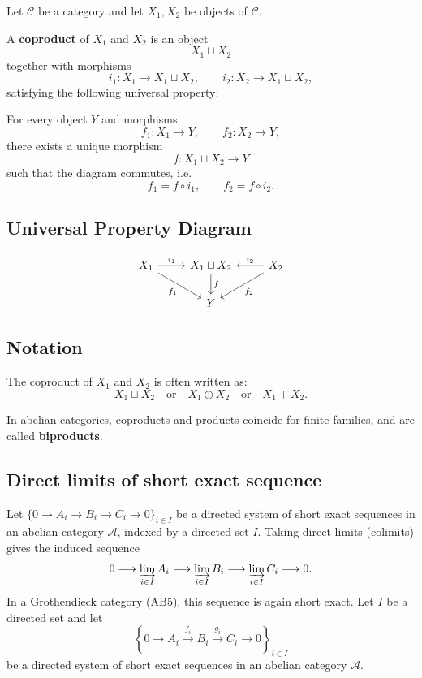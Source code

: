Let $\mathcal{C}$ be a category and let $X_1, X_2$ be objects of $\mathcal{C}$.

A \textbf{coproduct} of $X_1$ and $X_2$ is an object
\[
X_1 \sqcup X_2
\]
together with morphisms
\[
i_1: X_1 \to X_1 \sqcup X_2,
\qquad
i_2: X_2 \to X_1 \sqcup X_2,
\]
satisfying the following universal property:

For every object $Y$ and morphisms
\[
f_1: X_1 \to Y,
\qquad
f_2: X_2 \to Y,
\]
there exists a unique morphism
\[
f: X_1 \sqcup X_2 \to Y
\]
such that the diagram commutes, i.e.
\[
f_1 = f \circ i_1,
\qquad
f_2 = f \circ i_2.
\]

\subsection{Universal Property Diagram}

\[
\begin{tikzcd}
X_1 \arrow[r, "i_1"] \arrow[dr, "f_1"'] & X_1 \sqcup X_2 \arrow[d, "f"] & X_2 \arrow[l, "i_2"'] \arrow[dl, "f_2"] \\
& Y &
\end{tikzcd}
\]

\subsection{Notation}

The coproduct of $X_1$ and $X_2$ is often written as:
\[
X_1 \sqcup X_2
\quad \text{or} \quad
X_1 \oplus X_2
\quad \text{or} \quad
X_1 + X_2.
\]

In abelian categories, coproducts and products coincide for finite families, and are called \textbf{biproducts}.

\subsection{Direct limits of short exact sequence}

Let $\{0 \to A_i \to B_i \to C_i \to 0\}_{i \in I}$ be a directed system of short exact sequences in an abelian category $\mathcal{A}$, indexed by a directed set $I$.
Taking direct limits (colimits) gives the induced sequence
\[
0 \longrightarrow \varinjlim_{i \in I} A_i
\longrightarrow \varinjlim_{i \in I} B_i
\longrightarrow \varinjlim_{i \in I} C_i
\longrightarrow 0.
\]
In a Grothendieck category (AB5), this sequence is again short exact.
Let $I$ be a directed set and let
\[
\left\{0 \to A_i \xrightarrow{f_i} B_i \xrightarrow{g_i} C_i \to 0 \right\}_{i \in I}
\]
be a directed system of short exact sequences in an abelian category $\mathcal{A}$.

